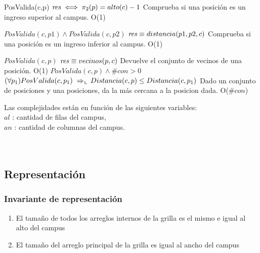  {PosValida(c,p)}
 {$\text{\textit{res}} \iff \pi_2(p)=alto(c)-1 $}
 {Comprueba si una posición es un ingreso superior al campus.}
 {O(1)}
 {}

 {$PosValida(c,p1) \land PosValida(c,p2)$}
 {$\text{\textit{res}} \equiv distancia (p1, p2, c) $}
 {Comprueba si una posición es un ingreso inferior al campus.}
 {O(1)}
 {}
 
 {$PosValida(c,p)$}
 {$\text{\textit{res}} \equiv vecinos (p, c) $}
 {Devuelve el conjunto de vecinos de una posición.}
 {O(1)}
 {}
 {$PosValida(c,p)\land \#con>0$}
 {$(\forall p_1) PosValida(c, p_1) \impluego Distancia(c,p) \leq Distancia(c, p_1) $}
 {Dado un conjunto de posiciones y una posiciones, da la más cercana a la posicion dada.}
 {O($\#con$)}
 {}

 
Las complejidades están en función de las siguientes variables:\\
$al$ : cantidad de filas del campus, \\
$an$ : cantidad de columnas del campus. \\
\\ \\



\subsection{Representación}


\subsubsection*{Invariante de representación}

\begin{enumerate}
  \item  El tamaño de todos los arreglos internos de la grilla es el mismo e igual al alto del campus
  \item El tamaño del arreglo principal de la grilla es igual al ancho del campus
\end{enumerate}  

